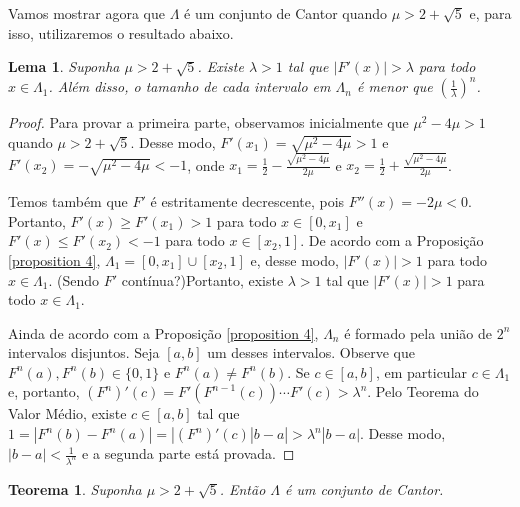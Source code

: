 \documentclass[a4paper, 12pt]{article}
\theoremstyle{definition}
\theoremstyle{plain}
\theoremstyle{plain}
\newtheorem{lemma}[definition]{Lema}
\theoremstyle{plain}
\newtheorem{theorem}[definition]{Teorema}
\theoremstyle{remark}
\begin{document}
Vamos mostrar agora que $\Lambda$ é um conjunto de Cantor quando $\mu > 2 + \sqrt{5}$ e, para isso, utilizaremos o resultado abaixo.

\begin{lemma}
Suponha $\mu > 2 + \sqrt{5}$. Existe $\lambda > 1$ tal que $|F'(x)| > \lambda$ para todo $x \in \Lambda_1$. Além disso, o tamanho de cada intervalo em $\Lambda_n$ é menor que $(\frac{1}{\lambda})^n$.
\end{lemma}

\begin{proof}
Para provar a primeira parte, observamos inicialmente que $\mu^2 - 4\mu > 1$ quando $\mu > 2 + \sqrt{5}$. Desse modo, $F'(x_1) = \sqrt{\mu^2 - 4\mu} > 1$ e $F'(x_2) = -\sqrt{\mu^2 - 4\mu} < -1$, onde $x_1 = \frac{1}{2} - \frac{\sqrt{\mu^2 - 4\mu}}{2\mu}$ e $x_2 = \frac{1}{2} + \frac{\sqrt{\mu^2 - 4\mu}}{2\mu}$.

Temos também que $F'$ é estritamente decrescente, pois $F''(x) = -2\mu < 0$.  Portanto, $F'(x) \geq F'(x_1) > 1$ para todo $x \in [0, x_1]$ e $F'(x) \leq F'(x_2) < -1$ para todo $x \in [x_2, 1]$. De acordo com a Proposição \ref{proposition 4}, $\Lambda_1 = [0, x_1] \cup [x_2, 1]$ e, desse modo, $|F'(x)| > 1$ para todo $x \in \Lambda_1$. (Sendo $F'$ contínua?)Portanto, existe $\lambda > 1$ tal que $|F'(x)| > 1$ para todo $x \in \Lambda_1$.

Ainda de acordo com a Proposição \ref{proposition 4}, $\Lambda_n$ é formado pela união de $2^n$ intervalos disjuntos. Seja $[a, b]$ um desses intervalos. Observe que $F^n(a), F^n(b) \in \{0, 1\}$ e $F^n(a) \neq F^n(b)$. Se $c \in [a, b]$, em particular $c \in \Lambda_1$ e, portanto, $(F^n)'(c) = F'(F^{n-1}(c)) \cdots F'(c) > \lambda^n$. Pelo Teorema do Valor Médio, existe $c \in [a, b]$ tal que $1 = |F^n(b) - F^n(a)| = |(F^n)'(c)|b - a| > \lambda^n|b - a|$. Desse modo, $|b - a| < \frac{1}{\lambda^n}$ e a segunda parte está provada.
\end{proof} 

\begin{theorem}
\label{Lambda is Cantor}
Suponha $\mu > 2 + \sqrt{5}$. Então $\Lambda$ é um conjunto de Cantor.
\end{theorem}
\end{document}
